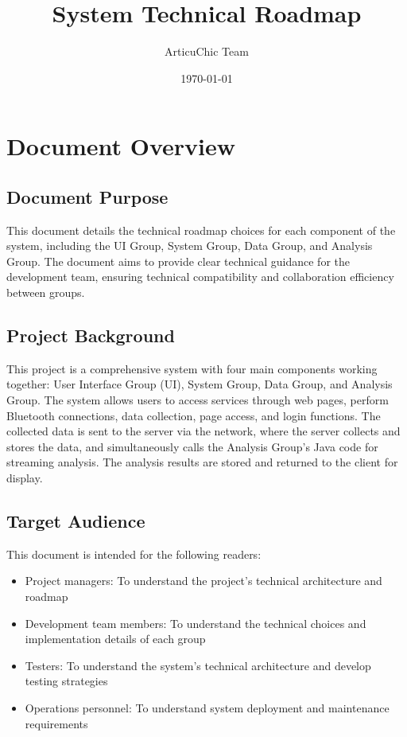 \documentclass[a4paper,12pt]{article}
\title{System Technical Roadmap}
\author{ArticuChic Team}
\date{\today}
\begin{document}
\maketitle
\tableofcontents
\newpage

\section{Document Overview}

\subsection{Document Purpose}

This document details the technical roadmap choices for each component of the system, including the UI Group, System Group, Data Group, and Analysis Group. The document aims to provide clear technical guidance for the development team, ensuring technical compatibility and collaboration efficiency between groups.

\subsection{Project Background}

This project is a comprehensive system with four main components working together: User Interface Group (UI), System Group, Data Group, and Analysis Group. The system allows users to access services through web pages, perform Bluetooth connections, data collection, page access, and login functions. The collected data is sent to the server via the network, where the server collects and stores the data, and simultaneously calls the Analysis Group's Java code for streaming analysis. The analysis results are stored and returned to the client for display.

\subsection{Target Audience}

This document is intended for the following readers:
\begin{itemize}
  \item Project managers: To understand the project's technical architecture and roadmap
  \item Development team members: To understand the technical choices and implementation details of each group
  \item Testers: To understand the system's technical architecture and develop testing strategies
  \item Operations personnel: To understand system deployment and maintenance requirements
\end{itemize}
\end{document}
